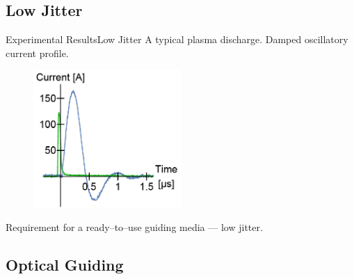 \documentclass[]{beamer}
\begin{document}
\subsection{Low Jitter}
\begin{frame}{Experimental Results}{Low Jitter}
  A typical plasma discharge. Damped oscillatory current profile.
  \begin{figure}
    \includegraphics[width=0.5\textwidth]{figures/results/typical.png}
  \end{figure}
  Requirement for a ready--to--use guiding media --- low jitter.
\end{frame}
\subsection{Optical Guiding}
\end{document}
